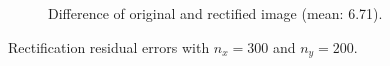 \begin{figure}[h]
\begin{subfigure}[b]{0.7\textwidth}
    \caption{Difference of original and rectified image (mean: 6.71).}
    \label{fig:rect_rdiff}
  \end{subfigure}
  \caption{Rectification residual errors with $n_x = 300$ and $n_y = 200$.}
  \label{fig:rect}
\end{figure}

